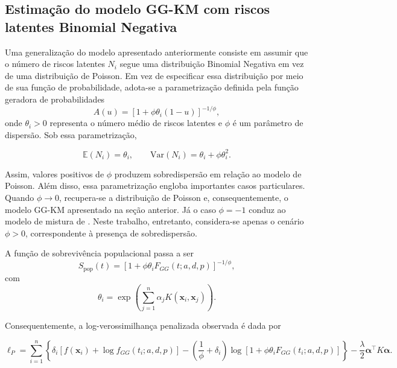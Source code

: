 \subsection{Estimação do modelo GG-KM com riscos latentes Binomial Negativa}

Uma generalização do modelo apresentado anteriormente consiste em assumir que o número de riscos latentes
\(N_i\) segue uma distribuição Binomial Negativa em vez de uma distribuição de Poisson. Em vez de
especificar essa distribuição por meio de sua função de probabilidade, adota-se a parametrização definida
pela função geradora de probabilidades
\begin{equation}
A(u)
=
\left[
1+\phi\theta_i(1-u)
\right]^{-1/\phi},
\end{equation}
onde \(\theta_i>0\) representa o número médio de riscos latentes e \(\phi\) é um parâmetro de dispersão.
Sob essa parametrização,

\begin{equation}
\mathbb{E}(N_i)=\theta_i,
\qquad
\mathrm{Var}(N_i)
=
\theta_i+\phi\theta_i^2.
\end{equation}

Assim, valores positivos de \(\phi\) produzem sobredispersão em relação ao modelo de Poisson. Além disso,
essa parametrização engloba importantes casos particulares. Quando \(\phi \to 0\), recupera-se a
distribuição de Poisson e, consequentemente, o modelo GG-KM apresentado na seção anterior. Já o caso
\(\phi=-1\) conduz ao modelo de mistura de . Neste trabalho, entretanto,
considera-se apenas o cenário \(\phi>0\), correspondente à presença de sobredispersão.

A função de sobrevivência populacional passa a ser
\begin{equation}
S_{\text{pop}}(t)
=
\left[
1+\phi\theta_i
F_{GG}(t;a,d,p)
\right]^{-1/\phi},
\end{equation}
com
\begin{equation}
\theta_i
=
\exp
\!\left(
\sum_{j=1}^{n}
\alpha_j
K(\mathbf{x}_i,\mathbf{x}_j)
\right).
\end{equation}

Consequentemente, a log-verossimilhança penalizada observada é dada por

\begin{equation}
\ell_P
=
\sum_{i=1}^{n}
\left\{
\delta_i
\left[
f(\mathbf{x}_i)
+
\log
f_{GG}(t_i;a,d,p)
\right]
-
\left(
\frac{1}{\phi}
+
\delta_i
\right)
\log
\left[
1+
\phi
\theta_i
F_{GG}(t_i;a,d,p)
\right]
\right\}
-
\frac{\lambda}{2}
\boldsymbol{\alpha}^{\top}
K
\boldsymbol{\alpha}.
\end{equation}

